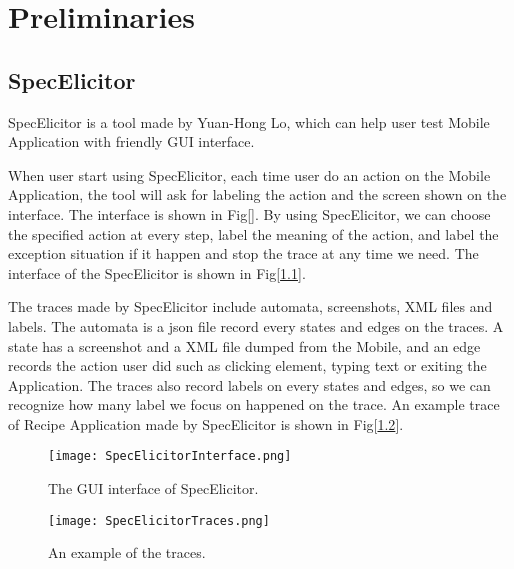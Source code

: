 \chapter{Preliminaries}\label{ch:preliminaries}


\section{SpecElicitor}

SpecElicitor is a tool made by Yuan-Hong Lo, 
which can help user test Mobile Application with friendly GUI interface.

When user start using SpecElicitor,
each time user do an action on the Mobile Application, 
the tool will ask for labeling the action and the screen shown on the interface.
The interface is shown in Fig[].
By using SpecElicitor, we can choose the specified action at every step, label the meaning of the action,
and label the exception situation if it happen and stop the trace at any time we need.
The interface of the SpecElicitor is shown in Fig[\ref{SpecElicitorInterface}].


The traces made by SpecElicitor include automata, screenshots, XML files and labels.
The automata is a json file record every states and edges on the traces.
A state has a screenshot and a XML file dumped from the Mobile,
and an edge records the action user did such as clicking element, typing text or exiting the Application.
The traces also record labels on every states and edges,
so we can recognize how many label we focus on happened on the trace.
An example trace of Recipe Application made by SpecElicitor is shown in Fig[\ref{SpecElicitorTraces}].


\begin{figure}[ht]
	\graphicspath{{pic/}}
	\begin{center}
		\texttt{[image: SpecElicitorInterface.png]}
		\caption{ The GUI interface of SpecElicitor.  }
		\label{SpecElicitorInterface}
	\end{center}
\end{figure}

\begin{figure}[ht]
	\graphicspath{{pic/}}
	\begin{center}
		\texttt{[image: SpecElicitorTraces.png]}
		\caption{ An example of the traces.  }
		\label{SpecElicitorTraces}
	\end{center}
\end{figure}

